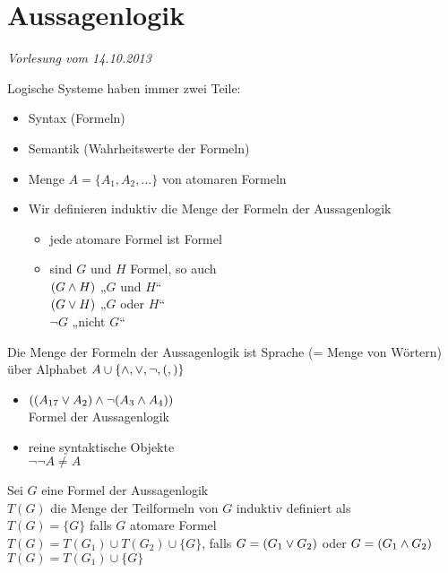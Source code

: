 
\section{Aussagenlogik}

\begin{flushright}
\textit{Vorlesung vom 14.10.2013}
\end{flushright}

Logische Systeme haben immer zwei Teile:
\begin{itemize}
\item Syntax (Formeln)
\item Semantik (Wahrheitswerte der Formeln)
\end{itemize}

\begin{itemize}
\item Menge $A = \{ A_1, A_2, ... \}$ von atomaren Formeln
\item Wir definieren induktiv die Menge der Formeln der Aussagenlogik
    \begin{itemize}
        \item jede atomare Formel ist Formel
        \item sind $G$ und $H$ Formel, so auch \\
$( G \wedge H )$ „$G$ und $H$“ \\
$(G \vee H)$ „$G$ oder $H$“ \\
$\neg G$ „nicht $G$“
    \end{itemize}
\end{itemize}

\bemerkung{}
Die Menge der Formeln der Aussagenlogik ist Sprache (= Menge von Wörtern) über Alphabet $A \cup \{\wedge, \vee, \neg, (, ) \}$\\

\beispiel{}
\begin{itemize}
\item $ \left( ( A_{17} \vee A_2 ) \wedge \neg (A_3 \wedge A_4) \right)$\\
    Formel der Aussagenlogik
\item reine syntaktische Objekte\\
    $\neg \neg A \neq A$
\end{itemize}

\beweis{}
Sei $G$ eine Formel der Aussagenlogik\\
$T(G)$ die Menge der Teilformeln von $G$ induktiv definiert als\\
$T(G) = \{ G \}$ falls $G$ atomare Formel\\
$T(G) = T(G_1) \cup T(G_2) \cup \{G\}$, falls $G = (G_1 \vee G_2)$ oder $G=(G_1 \wedge G_2)$\\
$T(G)=T(G_1) \cup \{G\}$\\

